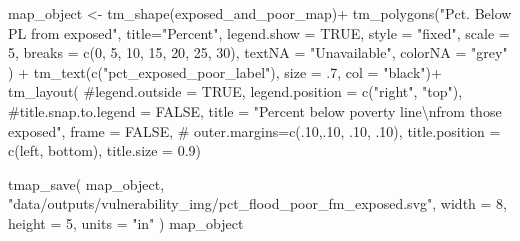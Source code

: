 \documentclass[
  letterpaper,
  DIV=11,
  numbers=noendperiod]{scrartcl}
\newenvironment{Shaded}{}{}
\newcommand{\AttributeTok}[1]{\textcolor[rgb]{0.84,0.23,0.29}{#1}}
\newcommand{\CommentTok}[1]{\textcolor[rgb]{0.42,0.45,0.49}{#1}}
\newcommand{\ConstantTok}[1]{\textcolor[rgb]{0.00,0.36,0.77}{#1}}
\newcommand{\DecValTok}[1]{\textcolor[rgb]{0.00,0.36,0.77}{#1}}
\newcommand{\FloatTok}[1]{\textcolor[rgb]{0.00,0.36,0.77}{#1}}
\newcommand{\FunctionTok}[1]{\textcolor[rgb]{0.44,0.26,0.76}{#1}}
\newcommand{\NormalTok}[1]{\textcolor[rgb]{0.14,0.16,0.18}{#1}}
\newcommand{\OtherTok}[1]{\textcolor[rgb]{0.44,0.26,0.76}{#1}}
\newcommand{\SpecialCharTok}[1]{\textcolor[rgb]{0.00,0.36,0.77}{#1}}
\newcommand{\StringTok}[1]{\textcolor[rgb]{0.01,0.18,0.38}{#1}}
\begin{document}
\begin{Shaded}
\begin{Highlighting}[]
\NormalTok{map\_object }\OtherTok{\textless{}{-}}
\FunctionTok{tm\_shape}\NormalTok{(exposed\_and\_poor\_map)}\SpecialCharTok{+}
  \FunctionTok{tm\_polygons}\NormalTok{(}\StringTok{"Pct. Below PL from exposed"}\NormalTok{,}
              \AttributeTok{title=}\StringTok{"Percent"}\NormalTok{, }
              \AttributeTok{legend.show =} \ConstantTok{TRUE}\NormalTok{,}
              \AttributeTok{style =} \StringTok{"fixed"}\NormalTok{,}
              \AttributeTok{scale =} \DecValTok{5}\NormalTok{,}
              \AttributeTok{breaks =} \FunctionTok{c}\NormalTok{(}\DecValTok{0}\NormalTok{, }\DecValTok{5}\NormalTok{, }\DecValTok{10}\NormalTok{, }\DecValTok{15}\NormalTok{, }\DecValTok{20}\NormalTok{, }\DecValTok{25}\NormalTok{, }\DecValTok{30}\NormalTok{),}
              \AttributeTok{textNA =} \StringTok{"Unavailable"}\NormalTok{,}
              \AttributeTok{colorNA =} \StringTok{"grey"}
\NormalTok{              ) }\SpecialCharTok{+}
  \FunctionTok{tm\_text}\NormalTok{(}\FunctionTok{c}\NormalTok{(}\StringTok{"pct\_exposed\_poor\_label"}\NormalTok{), }\AttributeTok{size =}\NormalTok{ .}\DecValTok{7}\NormalTok{, }\AttributeTok{col =} \StringTok{"black"}\NormalTok{)}\SpecialCharTok{+}
  \FunctionTok{tm\_layout}\NormalTok{(}
    \CommentTok{\#legend.outside = TRUE,}
    \AttributeTok{legend.position =} \FunctionTok{c}\NormalTok{(}\StringTok{"right"}\NormalTok{, }\StringTok{"top"}\NormalTok{),}
    \CommentTok{\#title.snap.to.legend = FALSE,}
    \AttributeTok{title =} 
      \StringTok{"Percent below poverty line}\SpecialCharTok{\textbackslash{}n}\StringTok{from those exposed"}\NormalTok{,}
    \AttributeTok{frame =} \ConstantTok{FALSE}\NormalTok{,}
\CommentTok{\#            outer.margins=c(.10,.10, .10, .10), }
            \AttributeTok{title.position =} \FunctionTok{c}\NormalTok{(}\StringTok{\textquotesingle{}left\textquotesingle{}}\NormalTok{, }\StringTok{\textquotesingle{}bottom\textquotesingle{}}\NormalTok{),}
            \AttributeTok{title.size =} \FloatTok{0.9}\NormalTok{)}

\FunctionTok{tmap\_save}\NormalTok{(}
\NormalTok{  map\_object,}
  \StringTok{"data/outputs/vulnerability\_img/pct\_flood\_poor\_fm\_exposed.svg"}\NormalTok{,}
  \AttributeTok{width =} \DecValTok{8}\NormalTok{,}
  \AttributeTok{height =} \DecValTok{5}\NormalTok{,}
  \AttributeTok{units =} \StringTok{"in"}
\NormalTok{)}
\NormalTok{map\_object}
\end{Highlighting}
\end{Shaded}
\end{document}
